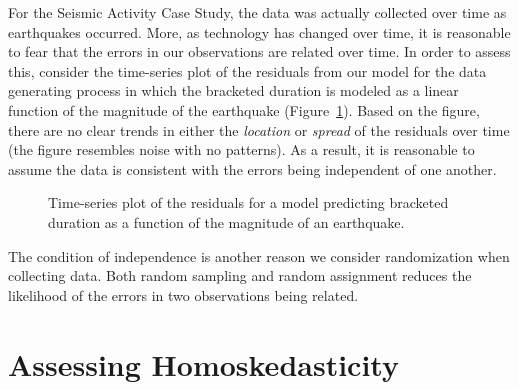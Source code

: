 \documentclass[
  letterpaper,
  DIV=11,
  numbers=noendperiod]{scrreprt}
\theoremstyle{plain}
\theoremstyle{definition}
\theoremstyle{definition}
\theoremstyle{remark}
\begin{document}
For the Seismic Activity Case Study, the data was actually collected
over time as earthquakes occurred. More, as technology has changed over
time, it is reasonable to fear that the errors in our observations are
related over time. In order to assess this, consider the time-series
plot of the residuals from our model for the data generating process in
which the bracketed duration is modeled as a linear function of the
magnitude of the earthquake
(Figure~\ref{fig-regassessment-independence}). Based on the figure,
there are no clear trends in either the \emph{location} or \emph{spread}
of the residuals over time (the figure resembles noise with no
patterns). As a result, it is reasonable to assume the data is
consistent with the errors being independent of one another.

\begin{figure}


\caption{\label{fig-regassessment-independence}Time-series plot of the
residuals for a model predicting bracketed duration as a function of the
magnitude of an earthquake.}

\end{figure}%

The condition of independence is another reason we consider
randomization when collecting data. Both random sampling and random
assignment reduces the likelihood of the errors in two observations
being related.

\section{Assessing Homoskedasticity}\label{assessing-homoskedasticity}
\end{document}
